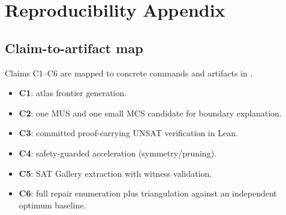 \section{Reproducibility Appendix}

\subsection{Claim-to-artifact map}
Claims C1--C6 are mapped to concrete commands and artifacts in .

\begin{itemize}[leftmargin=*]
  \item \textbf{C1}: atlas frontier generation.
  \item \textbf{C2}: one MUS and one small MCS candidate for boundary explanation.
  \item \textbf{C3}: committed proof-carrying UNSAT verification in Lean.
  \item \textbf{C4}: safety-guarded acceleration (symmetry/pruning).
  \item \textbf{C5}: SAT Gallery extraction with witness validation.
  \item \textbf{C6}: full repair enumeration plus triangulation against an independent optimum baseline.
\end{itemize}

